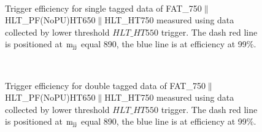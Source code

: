 \begin{figure}[htb]
\centering
       \\
\caption[Trigger efficiencies]{Trigger efficiency for single tagged data of FAT\_750$\parallel$HLT\_PF(NoPU)HT650$\parallel$HLT\_HT750 measured using data collected by lower threshold 
$HLT\_HT550$ trigger. The dash red line is positioned at ${\rm m_{jj}}$ equal 890\GeVcc, the blue line is at efficiency at 99$\%$. }
  \label{fig:trigger efficiencies part2}
\end{figure}

\begin{figure}[htb]
\centering
      \\
\caption[Trigger efficiencies]{Trigger efficiency for double tagged data of FAT\_750$\parallel$HLT\_PF(NoPU)HT650$\parallel$HLT\_HT750 measured using data collected by lower threshold 
$HLT\_HT550$ trigger. The dash red line is positioned at ${\rm m_{jj}}$ equal 890\GeVcc, the blue line is at efficiency at 99$\%$. }
  \label{fig:trigger efficiencies part3}
\end{figure}


\clearpage













